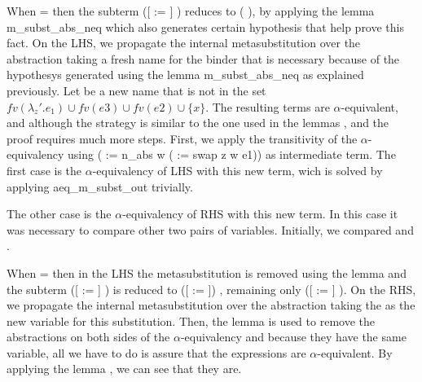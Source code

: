 \begin{coqdoccode}
\end{coqdoccode}
When  =  then the subterm ([ := ]   ) reduces to (  ), by applying the lemma m\_subst\_abs\_neq which also generates certain hypothesis that help prove this fact. On the LHS, we propagate the internal metasubstitution over the abstraction taking a fresh name for the binder that is necessary because of the hypothesys generated using the lemma m\_subst\_abs\_neq as explained previously. Let  be a new name that is not in the set $fv(\lambda_z'.e_1) \cup fv(e3) \cup fv(e2) \cup \{x\}$. The resulting terms are $\alpha$-equivalent, and although the strategy is similar to the one used in the lemmas ,  and  the proof requires much more steps. First, we apply the transitivity of the $\alpha$-equivalency using ( :=  n\_abs w ( :=  swap z w e1)) as intermediate term. The first case is the $\alpha$-equivalency of LHS with this new term, wich is solved by applying aeq\_m\_subst\_out trivially. 
\begin{coqdoccode}
\end{coqdoccode}
The other case is the $\alpha$-equivalency of RHS with this new term. In this case it was necessary to compare other two pairs of variables. Initially, we compared  and .
\begin{coqdoccode}
\end{coqdoccode}
When  =  then in the LHS the metasubstitution is removed using the lemma  and the subterm ([ := ]    ) is reduced to ([ := ]) , remaining only   ([ := ] ). On the RHS, we propagate the internal metasubstitution over the abstraction taking the  as the new variable for this substitution. Then, the lemma  is used to remove the abstractions on both sides of the $\alpha$-equivalency and because they have the same variable, all we have to do is assure that the expressions are $\alpha$-equivalent. By applying the lemma , we can see that they are. 
